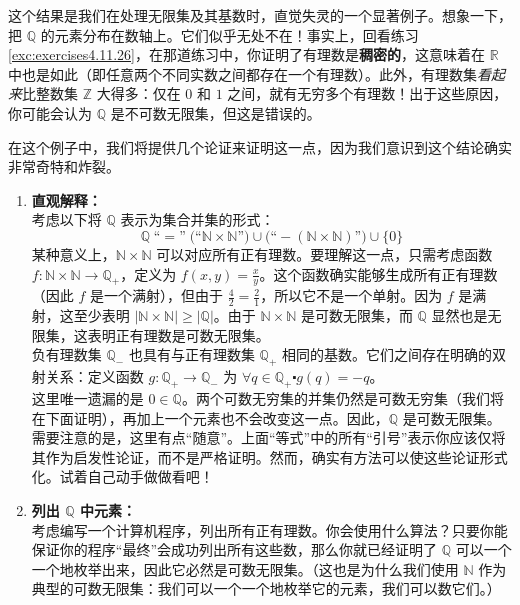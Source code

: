 \begin{example}

    这个结果是我们在处理无限集及其基数时，直觉失灵的一个显著例子。想象一下，把 $\mathbb{Q}$ 的元素分布在数轴上。它们似乎无处不在！事实上，回看练习 \ref{exc:exercises4.11.26}，在那道练习中，你证明了有理数是\textbf{稠密的}，这意味着在 $\mathbb{R}$ 中也是如此（即任意两个不同实数之间都存在一个有理数）。此外，有理数集\emph{看起来}比整数集 $\mathbb{Z}$ 大得多：仅在 $0$ 和 $1$ 之间，就有无穷多个有理数！出于这些原因，你可能会认为 $\mathbb{Q}$ 是不可数无限集，但这是错误的。

    在这个例子中，我们将提供几个论证来证明这一点，因为我们意识到这个结论确实非常奇特和炸裂。

    \begin{enumerate}[label=(\arabic*)]
        \item \textbf{直观解释：}\\
              考虑以下将 $\mathbb{Q}$ 表示为集合并集的形式：
              \[\mathbb{Q} \;\text{``}=\text{''}\; \big(\text{``}\mathbb{N} \times \mathbb{N}\text{''}\big) \cup \big(\text{``}-(\mathbb{N} \times \mathbb{N})\text{''}\big) \cup \{0\}\]
              某种意义上，$\mathbb{N} \times \mathbb{N}$ 可以对应所有正有理数。要理解这一点，只需考虑函数 $f : \mathbb{N} \times \mathbb{N} \to \mathbb{Q}_+$，定义为 $f(x, y) = \frac{x}{y}$。这个函数确实能够生成所有正有理数（因此 $f$ 是一个满射），但由于 $\frac{4}{2}=\frac{2}{1}$，所以它不是一个单射。因为 $f$ 是满射，这至少表明 $|\mathbb{N} \times \mathbb{N}| \ge |\mathbb{Q}|$。由于 $\mathbb{N} \times \mathbb{N}$ 是可数无限集，而 $\mathbb{Q}$ 显然也是无限集，这表明正有理数是可数无限集。\\

              负有理数集 $\mathbb{Q}_-$ 也具有与正有理数集 $\mathbb{Q}_+$ 相同的基数。它们之间存在明确的双射关系：定义函数 $g : \mathbb{Q}_+ \to \mathbb{Q}_-$ 为 $\forall q \in \mathbb{Q}_+ \centerdot g(q) = -q$。\\

              这里唯一遗漏的是 $0 \in \mathbb{Q}$。两个可数无穷集的并集仍然是可数无穷集（我们将在下面证明），再加上一个元素也不会改变这一点。因此，$\mathbb{Q}$ 是可数无限集。\\

              需要注意的是，这里有点``随意''。上面``等式''中的所有``引号''表示你应该仅将其作为启发性论证，而不是严格证明。然而，确实有方法可以使这些论证形式化。试着自己动手做做看吧！\\
        \item \textbf{列出 $\mathbb{Q}$ 中元素：}\\
              考虑编写一个计算机程序，列出所有正有理数。你会使用什么算法？只要你能保证你的程序``最终''会成功列出所有这些数，那么你就已经证明了 $\mathbb{Q}$ 可以一个一个地枚举出来，因此它必然是可数无限集。（这也是为什么我们使用 $\mathbb{N}$ 作为典型的可数无限集：我们可以一个一个地枚举它的元素，我们可以数它们。）\\


\end{enumerate}
\end{example}
